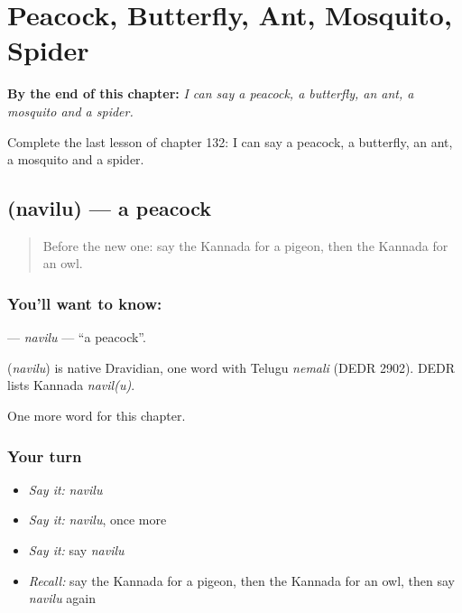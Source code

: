 
\chapter{Peacock, Butterfly, Ant, Mosquito, Spider}
\label{ch:ka-peacock-butterfly-ant-mosquito-spider}

\begin{chapteropening}
\textbf{By the end of this chapter:} \emph{I can say a peacock, a butterfly, an ant, a mosquito and a spider.}

Complete the last lesson of chapter 132: I can say a peacock, a butterfly, an ant, a mosquito and a spider.
\end{chapteropening}

\section[\texorpdfstring{\kn{ನವಿಲು} (navilu)}{ನವಿಲು (navilu)}]{ (navilu) — a peacock}

\label{lesson:KA-C132-navilu}



\begin{quote}
Before the new one: say the Kannada for a pigeon, then the Kannada for an owl.
\end{quote}

\subsection*{You'll want to know: }
\textbf{} — \emph{navilu} — \textquotedblleft{}a peacock\textquotedblright{}.

\begin{cousinweb}
\textbf{} (\emph{navilu}) is native Dravidian, one word with Telugu \emph{nemali} (DEDR 2902). DEDR lists Kannada \emph{navil(u)}.
\end{cousinweb}

\begin{grammarlens}[title={What you've built}]
One more word for this chapter.
\end{grammarlens}

\subsection*{Your turn}
\begin{itemize}
\raggedright
  \item \emph{Say it:} \emph{navilu}
  \item \emph{Say it:} \emph{navilu}, once more
  \item \emph{Say it:} say \emph{navilu}
  \item \emph{Recall:} say the Kannada for a pigeon, then the Kannada for an owl, then say \emph{navilu} again
\end{itemize}

